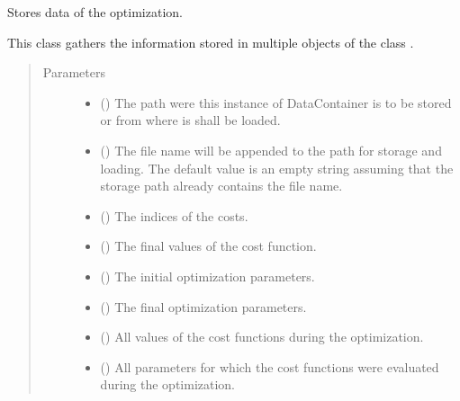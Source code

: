 \documentclass[letterpaper,10pt,english]{sphinxmanual}
\begin{document}
\begin{fulllineitems}
Stores data of the optimization.

This class gathers the information stored in multiple objects of the
class .
\begin{quote}\begin{description}
\item[{Parameters}] \leavevmode\begin{itemize}
\item {} 
 () \textendash{} The path were this instance of DataContainer is to be stored or from
where is shall be loaded.

\item {} 
 () \textendash{} The file name will be appended to the path for storage and loading. The
default value is an empty string assuming that the storage path already
contains the file name.

\item {} 
 () \textendash{} The indices of the costs.

\item {} 
 () \textendash{} The final values of the cost function.

\item {} 
 () \textendash{} The initial optimization parameters.

\item {} 
 () \textendash{} The final optimization parameters.

\item {} 
 () \textendash{} All values of the cost functions during the optimization.

\item {} 
 () \textendash{} All parameters for which the cost functions were evaluated during the
optimization.


\end{itemize}
\end{description}
\end{quote}
\end{fulllineitems}
\end{document}
